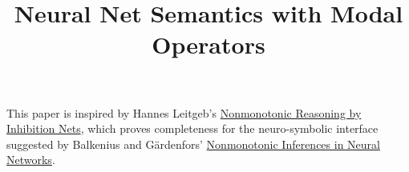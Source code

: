 \documentclass{article}
\begin{document}
\title{Neural Net Semantics with Modal Operators}

\maketitle

This paper is inspired by Hannes Leitgeb's
\href{https://pdf.sciencedirectassets.com/271585/1-s2.0-S0004370200X00768/1-s2.0-S000437020100073X/main.pdf?X-Amz-Security-Token=IQoJb3JpZ2luX2VjEBUaCXVzLWVhc3QtMSJIMEYCIQCYhHMlIPhIq3vO4rnf4y1swIkWc00HT6vtGY5twAuAygIhALXtW5sZJGGEIevyH%2B%2BXjijmgXy2ShEjSWoS6hA4ztVkKswECF0QBRoMMDU5MDAzNTQ2ODY1IgykI5CgK9WVME8ZMBoqqQSpliScdX5JGooz6vazOYjdbL08lgSWnU5bZfWtvxkwOvS%2BWi7FEeFc6OlKllF8GyahFm6htvFFreqTmdsfk2x3ffNWukRYgJEtp9xsxREbCyTdZs2p1zzHybDyrzqtqfOA0E6pShx5olx1jp%2BJl7hIG1Zvf%2FvfVISL44d4NVzpJJvBiGMzVl2UYdk%2BYW%2FVO7axQWxAoS28Vy1EEySDihEOHJYRyexTqt82XAZxAoRizFoCGScG1FMe5d5BWcmxfnPT5WrPT4zVRe6HhMHlF8X8wuw5IfMJ9F74ZJd2aS1kv09b8dJ4VZXvLTGOqx22WSxRBS%2FiG%2BFUp%2Fms89HO0WkUCguddmdyE%2BsQDVSx%2FfPLntqCa2fD%2FbWQzdIuhGBHP6K4AAWWUABK8UVU1Z%2Fu40Z8htWwqEloqV7S55QIDH%2BJI6N9JHaS6P5BnIaHvLzlYrJnJ%2FR8AyhJ%2FHp0g2sb%2FYyAL13xVEjYZGetubAD1P9TXrnlXsEiJpFeH5P4rUy%2F%2FXLerG2z69r250Pbhh8JoPH6uusYtzyha0fZalhu%2BA1pP3GfEVrikEDpxvx6tgExgNZHDE9UAfWF1NH%2F7X%2Fz46gAuT%2FnjvRZ9KcfpkOX6zzQtkkGyUiNdm3CBZ4Z6pSssQu8sTdv0w7htnFOWNwZnH8zSkcC9MjDMvfT%2FZNV3HN2XTVjLy9n4VWmTKO7m0zjZqVqn6B8CsaPRosze2qr3om4hxpCpSG6YpQPMPSGtp0GOqgB8IETl9v2KqQGOJQJO3CRaT1rkgXy%2BuWRY6WTp8ROr0I23070icKEf4ssWAwxSXneXGKkU6HQh7mvdLhjD0fOqjOebZmAg2Vvojm87UBddPvAC9s01O2byEjQ0xH3MMq2BvLfB%2FGlT%2BOnk4o0Aj7K%2BkA20dnf2h9ekSRmpr6QyuQ7GUPxYteMtRPntOwOwxshishUGWXynnZWGcbtUOJ%2BTU7AgDcdZrcX&X-Amz-Algorithm=AWS4-HMAC-SHA256&X-Amz-Date=20221229T131449Z&X-Amz-SignedHeaders=host&X-Amz-Expires=300&X-Amz-Credential=ASIAQ3PHCVTYTRHAT5NH%2F20221229%2Fus-east-1%2Fs3%2Faws4_request&X-Amz-Signature=6883ba7f9b34aebf025254e28f320fadb7efb3b1f4abd990fd3198cf2308a56e&hash=df607e446c88459bfb2a3e3b7078f82cd7eef5c00ba4d6a84ba2732a687200ef&host=68042c943591013ac2b2430a89b270f6af2c76d8dfd086a07176afe7c76c2c61&pii=S000437020100073X&tid=spdf-ffe2d701-58e9-4ee8-8716-53020a0b2676&sid=61edbba4786fd54fdd6949c8028454f460e6gxrqa&type=client&ua=515a52510501565e0007&rr=7812cd08cdd7e127}{Nonmonotonic
Reasoning by Inhibition Nets}, which proves completeness for the
neuro-symbolic interface suggested by Balkenius and
G{\"a}rdenfors'\href{https://scholar.google.com/citations?user=ZW8RWdAAAAAJ&hl=en&oi=sra}{}
\href{https://books.google.com/books?hl=en&lr=&id=1wwZAQAAIAAJ&oi=fnd&pg=PA32&dq=Nonmonotonic+inferences+in+neural+networks&ots=VsdxiIdpzf&sig=wC9oAbA8HUcIPI5gqmLNTDcc8tM}{Nonmonotonic
Inferences in Neural Networks}.
\end{document}
